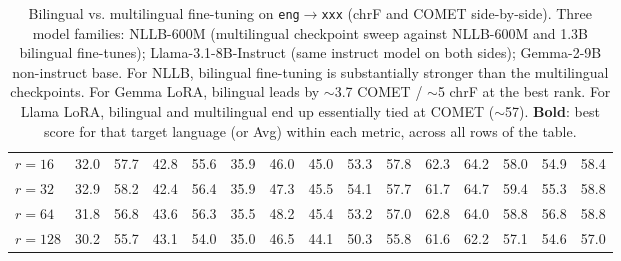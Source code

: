 \begin{table}[t]
\begin{tabular}{lrrrrrrrrrrrrrr}
\quad $r{=}16$ & 32.0 & 57.7 & 42.8 & 55.6 & 35.9 & 46.0 & 45.0 & 53.3 & 57.8 & 62.3 & 64.2 & 58.0 & 54.9 & 58.4 \\
\quad $r{=}32$ & 32.9 & 58.2 & 42.4 & 56.4 & 35.9 & 47.3 & 45.5 & 54.1 & 57.7 & 61.7 & 64.7 & 59.4 & 55.3 & 58.8 \\
\quad $r{=}64$ & 31.8 & 56.8 & 43.6 & 56.3 & 35.5 & 48.2 & 45.4 & 53.2 & 57.0 & 62.8 & 64.0 & 58.8 & 56.8 & 58.8 \\
\quad $r{=}128$ & 30.2 & 55.7 & 43.1 & 54.0 & 35.0 & 46.5 & 44.1 & 50.3 & 55.8 & 61.6 & 62.2 & 57.1 & 54.6 & 57.0 \\
\bottomrule
\end{tabular}
\caption{Bilingual vs. multilingual fine-tuning on \texttt{eng}$\to$\texttt{xxx} (chrF and COMET side-by-side). Three model families: NLLB-600M (multilingual checkpoint sweep against NLLB-600M and 1.3B bilingual fine-tunes); Llama-3.1-8B-Instruct (same instruct model on both sides); Gemma-2-9B non-instruct base. For NLLB, bilingual fine-tuning is substantially stronger than the multilingual checkpoints. For Gemma LoRA, bilingual leads by $\sim$3.7 COMET / $\sim$5 chrF at the best rank. For Llama LoRA, bilingual and multilingual end up essentially tied at COMET ($\sim$57). \textbf{Bold}: best score for that target language (or Avg) within each metric, across all rows of the table.}
\label{tab:multilingual_vs_bilingual}
\end{table}
